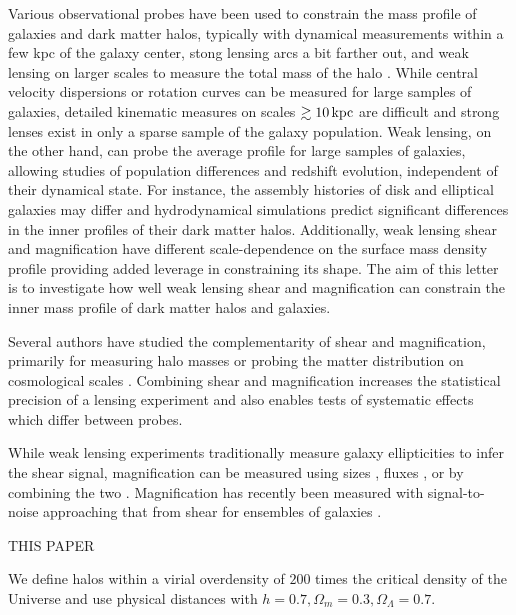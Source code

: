 \documentclass[12pt]{emulateapj}
\begin{document}
Various observational probes have been used to constrain the mass
profile of galaxies and dark matter halos, typically with dynamical
measurements within a few kpc of the galaxy center, stong lensing arcs
a bit farther out, and weak lensing on larger scales to measure the
total mass of the halo \citep[e.g.,][]{Sand2004, Koopmans2006,
  Gavazzi2007, Jiang2007, Auger2010, Schulz2010, Newman2013a}.  While
central velocity dispersions or rotation curves can be measured for
large samples of galaxies, detailed kinematic measures on scales
$\gtrsim10\,{\rm kpc}$ are difficult and strong lenses exist in only a sparse
sample of the galaxy population. Weak lensing, on the other hand, can
probe the average profile for large samples of galaxies, allowing
studies of population differences and redshift evolution, independent
of their dynamical state. For instance, the assembly histories of disk
and elliptical galaxies may differ and hydrodynamical simulations
predict significant differences in the inner profiles of their dark
matter halos. Additionally, weak lensing shear and magnification have
different scale-dependence on the surface mass density profile
providing added leverage in constraining its shape. The aim of this
letter is to investigate how well weak lensing shear and magnification
can constrain the inner mass profile of dark matter halos and
galaxies.

Several authors have studied the complementarity of shear and
magnification, primarily for measuring halo masses
\citep{Bartelmann1996, Bridle1998, Schneider2000, vanWaerbeke2010b,
  Rozo2010, Umetsu2011} or probing the matter distribution on
cosmological scales \citep{vanWaerbeke2010a, Casaponsa2013,
  Duncan2013, Krause2013}. Combining shear and magnification increases
the statistical precision of a lensing experiment and also enables
tests of systematic effects which differ between probes.

While weak lensing experiments traditionally measure galaxy
ellipticities to infer the shear signal, magnification can be measured
using sizes \citep{Bartelmann1995}, fluxes \citep{Broadhurst1995}, or
by combining the two \citep{Huff2011, Schmidt2012}. Magnification has
recently been measured with signal-to-noise approaching that from
shear for ensembles of galaxies \citep{Scranton2005, Hildebrandt2009,
  Menard2010, Huff2011, Ford2012, Schmidt2012}.

THIS PAPER

We define halos within a virial overdensity of $200$ times the
critical density of the Universe and use physical distances with
$h=0.7, \Omega_m=0.3, \Omega_\Lambda=0.7$.
\end{document}
